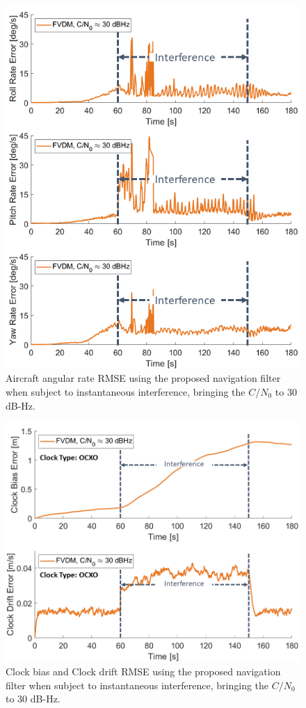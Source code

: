 \documentclass[12pt]{report}
\begin{document}
\begin{figure}[!ht]
  \centering
  \includegraphics[width=0.75\linewidth]{Figures/Results/trajectoryfigure/Slide11.PNG}
  \caption{Aircraft angular rate RMSE using the proposed navigation filter when subject to instantaneous interference, bringing the \(C/N_0\) to \(30\) dB-Hz.}\label{fig:Ang30}
\end{figure}


\begin{figure}[!ht]
  \centering
  \includegraphics[width=0.75\linewidth]{Figures/Results/trajectoryfigure/Slide23.PNG}
  \caption{Clock bias and Clock drift RMSE using the proposed navigation filter when subject to instantaneous interference, bringing the \(C/N_0\) to \(30\) dB-Hz.}\label{fig:Clk30}
\end{figure}
\end{document}
